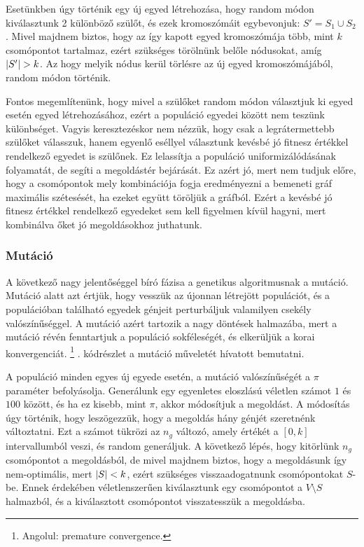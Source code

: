 Esetünkben úgy történik egy új egyed létrehozása, hogy random módon kiválasztunk 2 különböző szülőt,
és ezek kromoszómáit egybevonjuk: $S' = S_{1} \cup S_{2}$.
Mivel majdnem biztos, hogy az így kapott egyed kromoszómája több, mint $k$ csomópontot tartalmaz,
ezért szükséges törölnünk belőle nódusokat, amíg $\lvert S'\rvert > k$.
Az hogy melyik nódus kerül törlésre az új egyed kromoszómájából, random módon történik.

Fontos megemlítenünk, hogy mivel a szülőket random módon választjuk ki  egyed esetén egyed létrehozásához,
ezért a populáció egyedei között nem teszünk különbséget.
Vagyis keresztezéskor nem nézzük, hogy csak a legrátermettebb szülőket válasszuk,
hanem egyenlő eséllyel választunk kevésbé jó fitnesz értékkel rendelkező egyedet is szülőnek.
Ez lelassítja a populáció uniformizálódásának folyamatát, de segíti a megoldástér bejárását.
Ez azért jó, mert nem tudjuk előre, hogy a csomópontok mely kombinációja
fogja eredményezni a bemeneti gráf maximális szétesését, ha ezeket együtt töröljük a gráfból.
Ezért a kevésbé jó fitnesz értékkel rendelkező egyedeket sem kell figyelmen kívül hagyni,
mert kombinálva őket jó megoldásokhoz juthatunk.


\subsubsection{Mutáció}
A következő nagy jelentőséggel bíró fázisa a genetikus algoritmusnak a mutáció.
Mutáció alatt azt értjük, hogy vesszük az újonnan létrejött populációt,
és a populációban található egyedek génjeit perturbáljuk valamilyen csekély valószínűséggel.
A mutáció azért tartozik a nagy döntések halmazába,
mert a mutáció révén fenntartjuk a populáció sokféleségét, és elkerüljük a korai konvergenciát.
\footnote{
  Angolul: premature convergence.
}
. kódrészlet a mutáció műveletét hívatott bemutatni.


A populáció minden egyes új egyede esetén, a mutáció valószínűségét a $\pi$ paraméter befolyásolja.
Generálunk egy egyenletes eloszlású véletlen számot $1$ és $100$ között, és ha ez kisebb, mint $\pi$, akkor módosítjuk a megoldást.
A módosítás úgy történik, hogy leszögezzük, hogy a megoldás hány génjét szeretnénk változtatni.
Ezt a számot tükrözi az $n_{g}$ változó, amely értékét a $\left[0, k\right]$ intervallumból veszi, és random generáljuk.
A következő lépés, hogy kitörlünk $n_{g}$ csomópontot a megoldásból, de mivel majdnem biztos,
hogy a megoldásunk így nem-optimális, mert $\lvert S\rvert < k$, ezért szükséges visszaadogatnunk csomópontokat $S$-be.
Ennek érdekében véletlenszerűen kiválasztunk egy csomópontot a $V \setminus S$ halmazból,
és a kiválasztott csomópontot visszatesszük a megoldásba.



